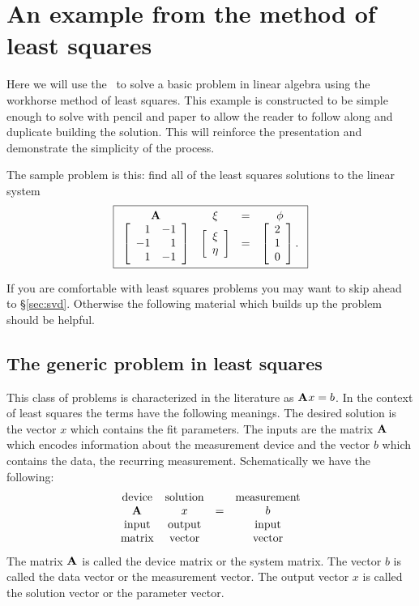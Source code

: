 \section{An example from the method of least squares}

Here we will use the \svdl \ to solve a basic problem in linear algebra using the workhorse method of least squares. This example is constructed to be simple enough to solve with pencil and paper to allow the reader to follow along and duplicate building the solution. This will reinforce the presentation and demonstrate the simplicity of the process.

The sample problem is this: find all of the least squares solutions to the linear system
\begin{equation}
\boxed{
\begin{array}{cccc}
    \A{} & \xi & = & \phi\\
    \Aexample &
    \mat{c}{\xi\\ \eta}
    & = &
    \phivector.
\end{array}
}
\label{eq:simple:problem}
\end{equation}

If you are comfortable with least squares problems you may want to skip ahead to \S \eqref{sec:svd}. Otherwise the following material which builds up the problem should be helpful.

\subsection{The generic problem in least squares}
This class of problems is characterized in the literature as $\textbf{A}^{\mathrm{}} x = b$. In the context of least squares the terms have the following meanings. The desired solution is the vector $x$ which contains the fit parameters. The inputs are the matrix $\textbf{A}^{\mathrm{}}$ which encodes information about the measurement device and the vector $b$ which contains the data, the recurring measurement. Schematically we have the following:
\begin{equation}
  \begin{array}{cccc}
  \text{device} & \text{solution} && \text{measurement}\\
  \textbf{A}^{\mathrm{}} & x & = & b\\
  \text{input} & \text{output} && \text{input}\\
  \text{matrix} & \text{vector} && \text{vector}\\
  \end{array}
\end{equation}
The matrix $\textbf{A}^{\mathrm{}}$ is called the device matrix or the system matrix. The vector $b$ is called the data vector or the measurement vector. The output vector $x$ is called the solution vector or the parameter vector.

